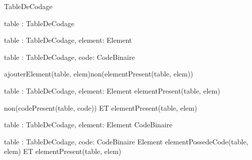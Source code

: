 \begin{algorithme}

		{}{TableDeCodage}{}

		{table : TableDeCodage}{\booleen}{}

		{table : TableDeCodage, element: Element}{\booleen}{}

		{table : TableDeCodage, code: CodeBinaire }{\booleen}{}

		{}
		{ajouterElement(table, elem)}{non(elementPresent(table, elem))}

		{table : TableDeCodage, element: Element}{\booleen}
		{elementPresent(table, elem)}

		{}
		{non(codePresent(table, code)) ET elementPresent(table, elem)}

		{table : TableDeCodage, element: Element }{CodeBinaire}{}

		{table : TableDeCodage, code: CodeBinaire }{Element}
		{elementPossedeCode(table, elem) ET elementPresent(table, elem)}
	
\end{algorithme}